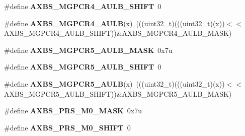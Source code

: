 \begin{DoxyCompactItemize}
\item 
\#define {\bfseries A\+X\+B\+S\+\_\+\+M\+G\+P\+C\+R4\+\_\+\+A\+U\+L\+B\+\_\+\+S\+H\+I\+FT}~0\hypertarget{group__AXBS__Register__Masks_gaf8f91ac5ba555a8dc2a1733463145139}{}\label{group__AXBS__Register__Masks_gaf8f91ac5ba555a8dc2a1733463145139}

\item 
\#define {\bfseries A\+X\+B\+S\+\_\+\+M\+G\+P\+C\+R4\+\_\+\+A\+U\+LB}(x)~(((uint32\+\_\+t)(((uint32\+\_\+t)(x))$<$$<$A\+X\+B\+S\+\_\+\+M\+G\+P\+C\+R4\+\_\+\+A\+U\+L\+B\+\_\+\+S\+H\+I\+FT))\&A\+X\+B\+S\+\_\+\+M\+G\+P\+C\+R4\+\_\+\+A\+U\+L\+B\+\_\+\+M\+A\+SK)\hypertarget{group__AXBS__Register__Masks_gaf5b88ce31357063d80980484b8236c71}{}\label{group__AXBS__Register__Masks_gaf5b88ce31357063d80980484b8236c71}

\item 
\#define {\bfseries A\+X\+B\+S\+\_\+\+M\+G\+P\+C\+R5\+\_\+\+A\+U\+L\+B\+\_\+\+M\+A\+SK}~0x7u\hypertarget{group__AXBS__Register__Masks_gaea6c5a570e0ec08d6419d8da4e6d82fd}{}\label{group__AXBS__Register__Masks_gaea6c5a570e0ec08d6419d8da4e6d82fd}

\item 
\#define {\bfseries A\+X\+B\+S\+\_\+\+M\+G\+P\+C\+R5\+\_\+\+A\+U\+L\+B\+\_\+\+S\+H\+I\+FT}~0\hypertarget{group__AXBS__Register__Masks_gab23b7b12e97e5a14e012697fc5b4ee49}{}\label{group__AXBS__Register__Masks_gab23b7b12e97e5a14e012697fc5b4ee49}

\item 
\#define {\bfseries A\+X\+B\+S\+\_\+\+M\+G\+P\+C\+R5\+\_\+\+A\+U\+LB}(x)~(((uint32\+\_\+t)(((uint32\+\_\+t)(x))$<$$<$A\+X\+B\+S\+\_\+\+M\+G\+P\+C\+R5\+\_\+\+A\+U\+L\+B\+\_\+\+S\+H\+I\+FT))\&A\+X\+B\+S\+\_\+\+M\+G\+P\+C\+R5\+\_\+\+A\+U\+L\+B\+\_\+\+M\+A\+SK)\hypertarget{group__AXBS__Register__Masks_gad8be8f658899ebea335f64937532371f}{}\label{group__AXBS__Register__Masks_gad8be8f658899ebea335f64937532371f}

\item 
\#define {\bfseries A\+X\+B\+S\+\_\+\+P\+R\+S\+\_\+\+M0\+\_\+\+M\+A\+SK}~0x7u\hypertarget{group__AXBS__Register__Masks_ga9e794f0ace10f0e077a92ce9f5abbb41}{}\label{group__AXBS__Register__Masks_ga9e794f0ace10f0e077a92ce9f5abbb41}

\item 
\#define {\bfseries A\+X\+B\+S\+\_\+\+P\+R\+S\+\_\+\+M0\+\_\+\+S\+H\+I\+FT}~0\hypertarget{group__AXBS__Register__Masks_ga86a8f40f6a5d45cd4868dce4833a17d5}{}\label{group__AXBS__Register__Masks_ga86a8f40f6a5d45cd4868dce4833a17d5}


\end{DoxyCompactItemize}
